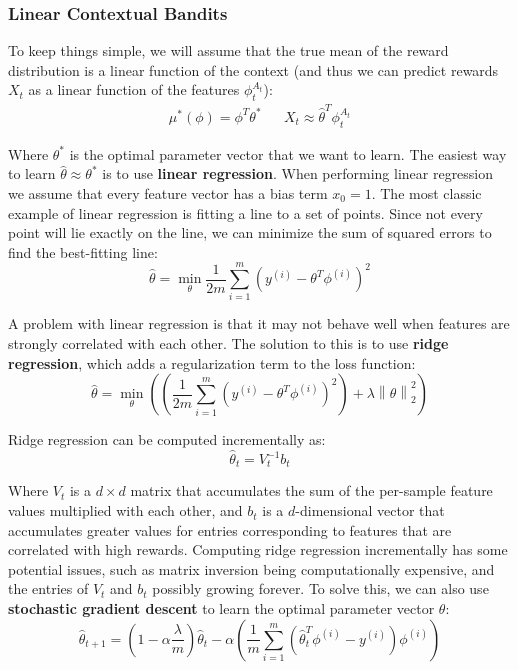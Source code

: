 \documentclass[12pt]{article}
\begin{document}
\subsubsection{Linear Contextual Bandits}
To keep things simple, we will assume that the true mean of the reward distribution is a linear function of the context (and thus we can predict rewards $X_t$ as a linear function of the features $\phi_t^{A_t}$):
\begin{align*} 
    \mu^*(\phi) = \phi^T \theta^* && X_t \approx \hat{\theta}^T \phi_t^{A_t}
\end{align*}

\noindent
Where $\theta^*$ is the optimal parameter vector that we want to learn.
The easiest way to learn $\hat{\theta} \approx \theta^*$ is to use \textbf{linear regression}.
When performing linear regression we assume that every feature vector has a bias term $x_0 = 1$.
The most classic example of linear regression is fitting a line to a set of points.
Since not every point will lie exactly on the line, we can minimize the sum of squared errors to find the best-fitting line:
\[ \hat{\theta} = \min_\theta \frac{1}{2m} \sum_{i = 1}^m (y^{(i)} - \theta^T \phi^{(i)})^2 \]

\noindent
A problem with linear regression is that it may not behave well when features are strongly correlated with each other.
The solution to this is to use \textbf{ridge regression}, which adds a regularization term to the loss function:
\[ \hat{\theta} = \min_\theta \left( \left( \frac{1}{2m} \sum_{i = 1}^m (y^{(i)} - \theta^T \phi^{(i)})^2 \right) + \lambda \left\lVert \theta \right\rVert_2^2 \right) \]

\noindent
Ridge regression can be computed incrementally as:
\[ \hat{\theta}_t = V_t^{-1}b_t \]

\noindent
Where $V_t$ is a $d \times d$ matrix that accumulates the sum of the per-sample feature values multiplied with each other, and $b_t$ is a $d$-dimensional vector that accumulates greater values for entries corresponding to features that are correlated with high rewards.
Computing ridge regression incrementally has some potential issues, such as matrix inversion being computationally expensive, and the entries of $V_t$ and $b_t$ possibly growing forever.
To solve this, we can also use \textbf{stochastic gradient descent} to learn the optimal parameter vector $\theta$:
\[ \hat{\theta}_{t + 1} = \left( 1 - \alpha \frac{\lambda}{m} \right) \hat{\theta}_t - \alpha \left( \frac{1}{m} \sum_{i = 1}^m \left( \hat{\theta}_t^T \phi^{(i)} - y^{(i)} \right) \phi^{(i)} \right) \]
\end{document}
